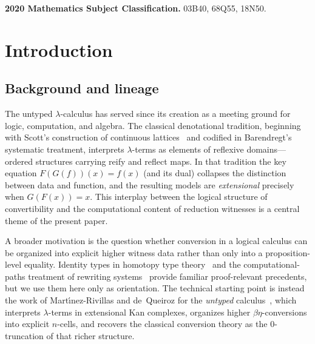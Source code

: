 \documentclass[webpdf,traditional,large,numbered]{oup-authoring-template}
\theoremstyle{thmstyleone}%
\theoremstyle{thmstyletwo}%
\theoremstyle{thmstylethree}%
\begin{document}

\maketitle

\noindent\textbf{2020 Mathematics Subject Classification.}
03B40, 68Q55, 18N50.
\par\medskip

\section{Introduction}\label{sec:intro}

\subsection{Background and lineage}

The untyped $\lambda$-calculus has served since its creation as a meeting ground
for logic, computation, and algebra.  The classical denotational tradition,
beginning with Scott's construction of continuous
lattices~\cite{Scott:continuous} and codified in
Barendregt's~\cite{Barendregt:lambda} systematic treatment, interprets
$\lambda$-terms as elements of reflexive domains---ordered structures carrying
reify and reflect maps.  In that tradition the key equation
$F(G(f))(x)=f(x)$ (and its dual) collapses the distinction between data and
function, and the resulting models are \emph{extensional} precisely when
$G(F(x))=x$.
This interplay between the logical structure of convertibility and the
computational content of reduction witnesses is a central theme of the present
paper.

A broader motivation is the question whether conversion in a logical calculus
can be organized into explicit higher witness data rather than only into a
proposition-level equality.  Identity types in homotopy type
theory~\cite{HoTT} and the computational-paths treatment of rewriting
systems~\cite{deVeras:computational} provide familiar proof-relevant
precedents, but we use them here only as orientation.  The technical starting
point is instead the work of Mart\'{\i}nez-Rivillas and de~Queiroz for the
\emph{untyped} calculus~\cite{MRdQ:homotopydomain,MRdQ:topological,MRdQ:theory,MRdQ:Kinfinity},
which interprets $\lambda$-terms in extensional Kan complexes, organizes higher
$\beta\eta$-conversions into explicit $n$-cells, and recovers the classical
conversion theory as the $0$-truncation of that richer structure.
\end{document}
